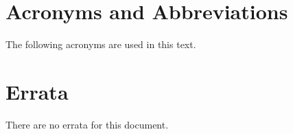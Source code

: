 \documentclass[justify]{nasa-ese}
\begin{document}
\section{Acronyms and Abbreviations}
The following acronyms are used in this text.
\begin{acronym}

\end{acronym}

\section{Errata}

There are no errata for this document.

\begin{comment}

\section{Change log}

\begin{verbatim}
$Log: dap_2_data_model.tex,v $
Revision 1.36  2005/05/03 20:34:01  jimg
Updated

Revision 1.35  2005/04/27 01:19:54  jimg
Updated the change log as per Siri's request.

Revision 1.34  2005/04/20 18:16:45  jimg
Last round of changes before it goes to NASA.

Revision 1.33  2005/04/12 04:24:17  jimg
Added complete addresses for the authors.

Revision 1.32  2005/04/12 04:12:20  jimg
Updated date on change log.

Revision 1.31  2005/04/12 03:54:46  jimg
Minor fixes for latex.

Revision 1.30  2005/04/12 03:41:16  jimg
Added subsection for conditional requests. Added a comment about
encoding zero-length sequences.

Revision 1.29  2005/04/06 17:58:05  jimg
Changes from John Chamberlain: The Attribute grammar did not include
attribute vectors.

Revision 1.28  2005/04/06 03:05:57  jimg
Changes from the penultimate revision of the last draft.

Revision 1.27  2005/01/17 23:38:12  jimg
Updated version log.

Revision 1.26  2005/01/17 23:31:46  jimg
Changes from Benno Blumenthal (Columbia Univ.) and Ruixin Yang (GMU).

Revision 1.25  2004/12/20 20:44:54  jimg
Changes as per the TWG and solicited reviews.


\end{comment}
\end{document}
